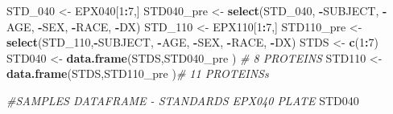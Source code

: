 \documentclass[]{article}
\newenvironment{Shaded}{\begin{snugshade}}{\end{snugshade}}
\newcommand{\CommentTok}[1]{\textcolor[rgb]{0.56,0.35,0.01}{\textit{#1}}}
\newcommand{\DecValTok}[1]{\textcolor[rgb]{0.00,0.00,0.81}{#1}}
\newcommand{\KeywordTok}[1]{\textcolor[rgb]{0.13,0.29,0.53}{\textbf{#1}}}
\newcommand{\NormalTok}[1]{#1}
\newcommand{\OperatorTok}[1]{\textcolor[rgb]{0.81,0.36,0.00}{\textbf{#1}}}
\newcommand{\StringTok}[1]{\textcolor[rgb]{0.31,0.60,0.02}{#1}}
\begin{document}
\begin{Shaded}
\begin{Highlighting}[]
\NormalTok{STD_}\DecValTok{040}\NormalTok{ <-}\StringTok{ }\NormalTok{EPX040[}\DecValTok{1}\OperatorTok{:}\DecValTok{7}\NormalTok{,]}
\NormalTok{STD040_pre <-}\StringTok{ }\KeywordTok{select}\NormalTok{(STD_}\DecValTok{040}\NormalTok{, }\OperatorTok{-}\NormalTok{SUBJECT, }\OperatorTok{-}\NormalTok{AGE, }\OperatorTok{-}\NormalTok{SEX, }\OperatorTok{-}\NormalTok{RACE, }\OperatorTok{-}\NormalTok{DX)}
\NormalTok{STD_}\DecValTok{110}\NormalTok{ <-}\StringTok{ }\NormalTok{EPX110[}\DecValTok{1}\OperatorTok{:}\DecValTok{7}\NormalTok{,]}
\NormalTok{STD110_pre <-}\StringTok{ }\KeywordTok{select}\NormalTok{(STD_}\DecValTok{110}\NormalTok{,}\OperatorTok{-}\NormalTok{SUBJECT, }\OperatorTok{-}\NormalTok{AGE, }\OperatorTok{-}\NormalTok{SEX, }\OperatorTok{-}\NormalTok{RACE, }\OperatorTok{-}\NormalTok{DX)}
\NormalTok{STDS <-}\StringTok{ }\KeywordTok{c}\NormalTok{(}\DecValTok{1}\OperatorTok{:}\DecValTok{7}\NormalTok{)}
\NormalTok{STD040 <-}\StringTok{ }\KeywordTok{data.frame}\NormalTok{(STDS,STD040_pre ) }\CommentTok{# 8  PROTEINS}
\NormalTok{STD110 <-}\StringTok{ }\KeywordTok{data.frame}\NormalTok{(STDS,STD110_pre )}\CommentTok{#  11 PROTEINSs}
\end{Highlighting}
\end{Shaded}

\begin{Shaded}
\begin{Highlighting}[]
\CommentTok{#SAMPLES DATAFRAME - STANDARDS EPX040 PLATE}
\NormalTok{STD040}
\end{Highlighting}
\end{Shaded}
\end{document}

